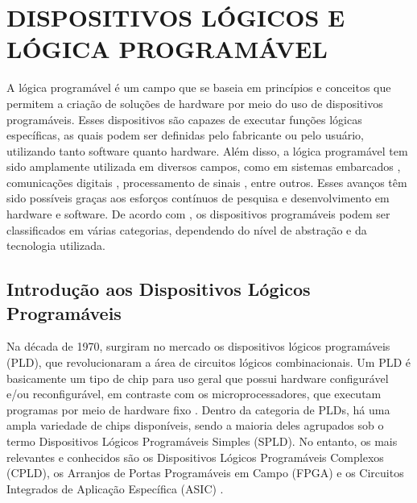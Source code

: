 \chapter{DISPOSITIVOS LÓGICOS E LÓGICA PROGRAMÁVEL}
\label{cap2}

A lógica programável é um campo que se baseia em princípios e conceitos que permitem a criação de soluções de hardware por meio do uso de dispositivos programáveis. Esses dispositivos são capazes de executar funções lógicas específicas, as quais podem ser definidas pelo fabricante ou pelo usuário, utilizando tanto software quanto hardware.
Além disso, a lógica programável tem sido amplamente utilizada em diversos campos, como em sistemas embarcados \cite{mishra2018fpga}, comunicações digitais \cite{proakis2006digital}, processamento de sinais \cite{shynk1999review}, entre outros. Esses avanços têm sido possíveis graças aos esforços contínuos de pesquisa e desenvolvimento em hardware e software. De acordo com , os dispositivos programáveis podem ser classificados em várias categorias, dependendo do nível de abstração e da tecnologia utilizada. 

\section{Introdução aos Dispositivos Lógicos Programáveis}

Na década de 1970, surgiram no mercado os dispositivos lógicos programáveis (PLD), que revolucionaram a área de circuitos lógicos combinacionais. Um PLD é basicamente um tipo de chip para uso geral que possui hardware configurável e/ou reconfigurável, em contraste com os microprocessadores, que executam programas por meio de hardware fixo \cite{pedroni2010eletronica}. Dentro da categoria de PLDs, há uma ampla variedade de chips disponíveis, sendo a maioria deles agrupados sob o termo Dispositivos Lógicos Programáveis Simples (SPLD). No entanto, os mais relevantes e conhecidos são os Dispositivos Lógicos Programáveis Complexos (CPLD), os Arranjos de Portas Programáveis em Campo (FPGA) e os Circuitos Integrados de Aplicação Específica (ASIC) \cite{moore2017fpgas}. 

